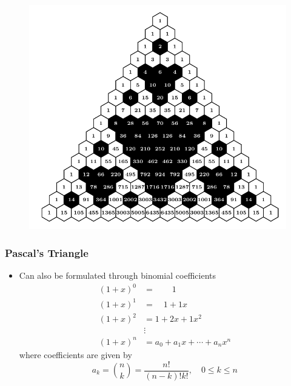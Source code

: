 \documentclass{beamer}
\begin{document}
\begin{frame}
    \begin{figure}
        \centering 
        \includegraphics[scale=0.8]{PascalMod2.pdf}
    \end{figure}
\end{frame}
    

\begin{frame}
    \frametitle{Pascal's Triangle}
    \begin{itemize}
        \item
        Can also be formulated through binomial coefficients
        \begin{align*}
            (1+x)^{0} &=\qquad 1 \\
            (1+x)^{1} &=\quad 1+1 x \\
            (1+x)^{2} &= 1+2 x+1 x^{2} \\ & \vdots \\(1+x)^{n} &=a_{0}+a_{1} x+\cdots+a_{n} x^{n} 
        \end{align*}
        where coefficients are given by
        \begin{equation*}
            a_{k}= \binom{n}{k} =\frac{n !}{(n-k) ! k !}, \quad 0 \leq k \leq n
        \end{equation*}
    \end{itemize}
\end{frame}
\end{document}
